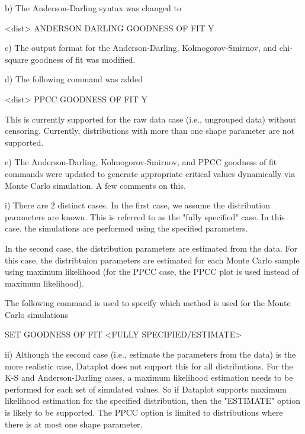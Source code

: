 {    b) The Anderson-Darling syntax was changed to

           <dist> ANDERSON DARLING GOODNESS OF FIT Y

    c) The output format for the Anderson-Darling, Kolmogorov-Smirnov,
       and chi-square goodness of fit was modified.

    d) The following command was added

           <dist> PPCC GOODNESS OF FIT Y

       This is currently supported for the raw data case (i.e.,
       ungrouped data) without censoring.  Currently, distributions
       with more than one shape parameter are not supported.

    e) The Anderson-Darling, Kolmogorov-Smirnov, and PPCC
       goodness of fit commands were updated to generate appropriate
       critical values dynamically via Monte Carlo simulation.  A
       few comments on this.

          i) There are 2 distinct cases.  In the first case, we
             assume the distribution parameters are known.  This
             is referred to as the "fully specified" case.  In this
             case, the simulations are performed using the specified
             parameters.

             In the second case, the distribution parameters are
             estimated from the data.  For this case, the 
             distribtuion parameters are estimated for each
             Monte Carlo sample using maximum likelihood (for the
             PPCC case, the PPCC plot is used instead of maximum
             likelihood).
  
             The following command is used to specify which method
             is used for the Monte Carlo simulations

                SET GOODNESS OF FIT <FULLY SPECIFIED/ESTIMATE>

         ii) Although the second case (i.e., estimate the parameters
             from the data) is the more realistic case, Dataplot
             does not support this for all distributions.  For the
             K-S and Anderson-Darling cases, a maximum likelihood
             estimation needs to be performed for each set of
             simulated values.  So if Dataplot supports maximum
             likelihood estimation for the specified distribution,
             then the "ESTIMATE" option is likely to be supported.
             The PPCC option is limited to distributions where
             there is at most one shape parameter.

}
